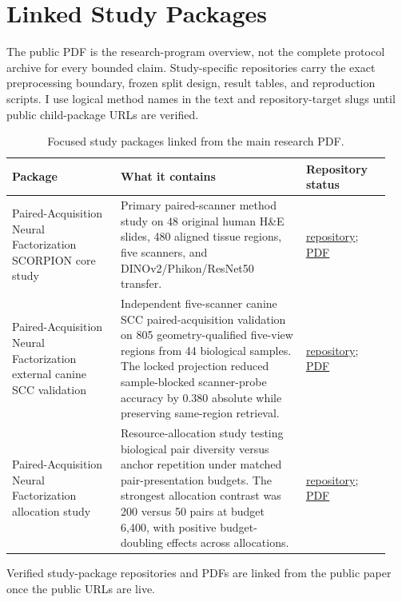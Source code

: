 ﻿\section{Linked Study Packages}
The public PDF is the research-program overview, not the complete protocol archive for every bounded claim. Study-specific repositories carry the exact preprocessing boundary, frozen split design, result tables, and reproduction scripts. I use logical method names in the text and repository-target slugs until public child-package URLs are verified.

\begin{table}[t]
\centering
\caption{Focused study packages linked from the main research PDF.}
\small
\begin{tabular}{p{0.27\linewidth}p{0.46\linewidth}p{0.21\linewidth}}
\toprule
Package & What it contains & Repository status \\
\midrule
Paired-Acquisition Neural Factorization SCORPION core study & Primary paired-scanner method study on 48 original human H\&E slides, 480 aligned tissue regions, five scanners, and DINOv2/Phikon/ResNet50 transfer. & \href{https://github.com/matthewvaishnav/paired-acquisition-factorization-scorpion}{repository}; \href{https://matthewvaishnav.github.io/paired-acquisition-factorization-scorpion/paired-acquisition-factorization-scorpion.pdf}{PDF} \\
Paired-Acquisition Neural Factorization external canine SCC validation & Independent five-scanner canine SCC paired-acquisition validation on 805 geometry-qualified five-view regions from 44 biological samples. The locked projection reduced sample-blocked scanner-probe accuracy by 0.380 absolute while preserving same-region retrieval. & \href{https://github.com/matthewvaishnav/paired-acquisition-factorization-caninescc}{repository}; \href{https://matthewvaishnav.github.io/paired-acquisition-factorization-caninescc/paired-acquisition-factorization-caninescc.pdf}{PDF} \\
Paired-Acquisition Neural Factorization allocation study & Resource-allocation study testing biological pair diversity versus anchor repetition under matched pair-presentation budgets. The strongest allocation contrast was 200 versus 50 pairs at budget 6,400, with positive budget-doubling effects across allocations. & \href{https://github.com/matthewvaishnav/paired-acquisition-factorization-allocation}{repository}; \href{https://matthewvaishnav.github.io/paired-acquisition-factorization-allocation/paired-acquisition-factorization-allocation.pdf}{PDF} \\
\bottomrule
\end{tabular}
\label{tab:linked_study_packages}
\end{table}

Verified study-package repositories and PDFs are linked from the public paper once the public URLs are live.

